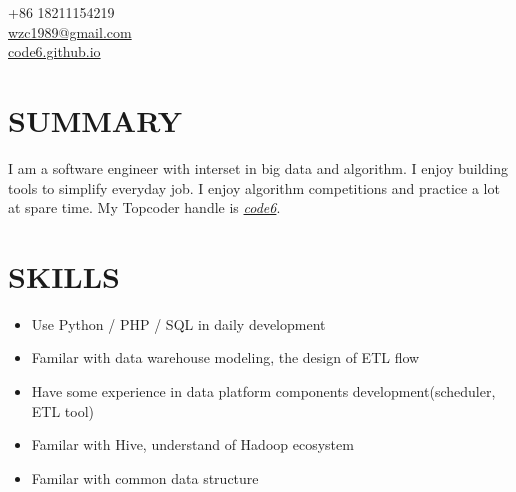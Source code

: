 \documentclass[margin,line]{resume}
\begin{document}
{
	\sc
    \hfill +86 18211154219                  \vspace{0mm}\\\vspace{0mm}%
    \hfill \href{mailto:wzc1989@gmail.com}{wzc1989@gmail.com}  \vspace{0mm}\\\vspace{0mm}%
    \hfill  \href{http://code6.github.io}{code6.github.io}      \vspace{0mm}\\\vspace{-10mm}%

}

\begin{resume}

\vspace{1mm}

    \section{\mysidestyle \textbf{\large{S}\small{UMMARY}}}
    I am a software engineer with interset in big data and algorithm. I enjoy building tools to simplify everyday job. I enjoy algorithm competitions and practice a lot at spare time. My Topcoder handle is \href{http://www.topcoder.com/tc?module=MemberProfile&cr=22758532}{\emph{code6}}.


\sectionline

    \section{\mysidestyle \textbf{\large{S}\small{KILLS}}}\vspace{-0.1mm}
    \begin{itemize}[leftmargin=3mm]
        \item Use Python / PHP / SQL in daily development
        \item Familar with data warehouse modeling, the design of ETL flow
        \item Have some experience in data platform components development(scheduler, ETL tool)
        \item Familar with Hive, understand of Hadoop ecosystem
        \item Familar with common data structure
    \end{itemize}\vspace{-4mm}


\end{resume}
\end{document}
